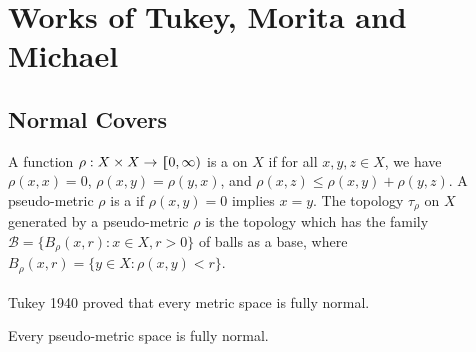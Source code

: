 \documentclass[main.tex]{subfiles}
\begin{document}
	
	
\chapter{Works of Tukey, Morita and Michael} 
	\label{ch2}



\section{Normal Covers}\label{sec:2.1}

{ \label{def:2.1.1}
	A function $\rho: X \times X \to \hstretch{1.8}{[}0, \infty)$ is a 
	on $X$ if for all $x, y, z \in X$, we have $\rho(x, x) = 0$, $\rho(x, y) = \rho(y, x)$, 
	and $\rho(x, z) \le \rho(x, y) + \rho(y, z)$. A pseudo-metric $\rho$ is a 
	if $\rho(x, y) = 0$ implies $x = y$. 
	The topology $\tau_\rho$ on $X$ generated by a pseudo-metric $\rho$ is 
	the topology which has the family $\mathscr{B} = \{B_\rho(x, r): x \in X, r > 0\}$ 
	of balls as a base, where $B_\rho(x, r) = \{y \in X: \rho(x, y) < r\}$.
}

\vspace{8pt}
\hstretch{1.8}{[}Tukey 1940\hstretch{1.8}{]}\textsuperscript{\cite{Tukey}} proved that every metric space is fully normal.

{\theorem{}\label{th:2.1.2} Every pseudo-metric space is fully normal.
}
\end{document}
